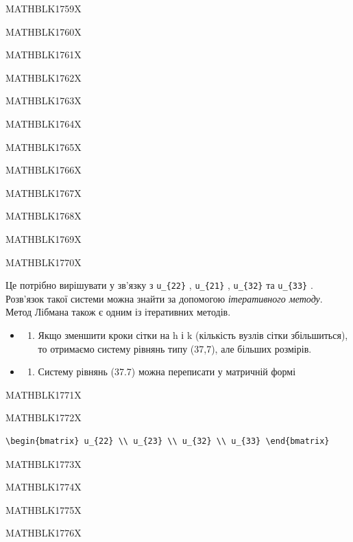 \documentclass[
  ukrainian,
]{article}
\providecommand{\tightlist}{%
  \setlength{\itemsep}{0pt}\setlength{\parskip}{0pt}}
\begin{document}
MATHBLK1759X

MATHBLK1760X

MATHBLK1761X

MATHBLK1762X

MATHBLK1763X

MATHBLK1764X

MATHBLK1765X

MATHBLK1766X

MATHBLK1767X

MATHBLK1768X

MATHBLK1769X

MATHBLK1770X

Це потрібно вирішувати у зв'язку з \texttt{u\_\{22\}} ,
\texttt{u\_\{21\}} , \texttt{u\_\{32\}} та \texttt{u\_\{33\}} .
Розв'язок такої системи можна знайти за допомогою \emph{ітеративного
методу}. Метод Лібмана також є одним із ітеративних методів.

\begin{itemize}
\tightlist
\item
  \begin{enumerate}
  \def\labelenumi{\arabic{enumi}.}
  \setcounter{enumi}{1}
  \tightlist
  \item
    Якщо зменшити кроки сітки на h і k (кількість вузлів сітки
    збільшиться), то отримаємо систему рівнянь типу (37,7), але більших
    розмірів.
  \end{enumerate}
\item
  \begin{enumerate}
  \def\labelenumi{\arabic{enumi}.}
  \setcounter{enumi}{2}
  \tightlist
  \item
    Систему рівнянь (37.7) можна переписати у матричній формі
  \end{enumerate}
\end{itemize}

MATHBLK1771X

MATHBLK1772X

\begin{verbatim}
\begin{bmatrix} u_{22} \\ u_{23} \\ u_{32} \\ u_{33} \end{bmatrix}
\end{verbatim}

MATHBLK1773X

MATHBLK1774X

MATHBLK1775X

MATHBLK1776X
\end{document}
